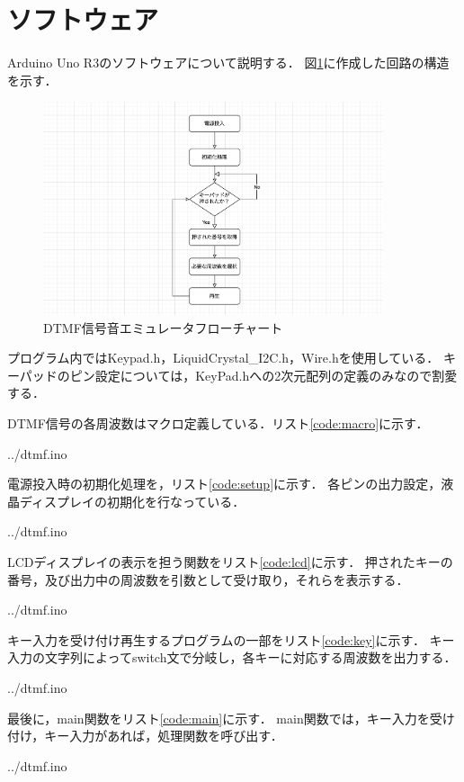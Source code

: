 \documentclass[dvipdfmx,titlepage,a4j]{jsarticle}  %
\begin{document}
\section{ソフトウェア}
Arduino Uno R3のソフトウェアについて説明する．
図\ref{fig:flow.png}に作成した回路の構造を示す．
\begin{figure}[H]
  \centering
  \includegraphics[width=10cm]{../fig/flow.png}
  \caption{DTMF信号音エミュレータフローチャート}
  \label{fig:flow.png}
\end{figure}
プログラム内ではKeypad.h，LiquidCrystal\_I2C.h，Wire.hを使用している．
キーパッドのピン設定については，KeyPad.hへの2次元配列の定義のみなので割愛する．

DTMF信号の各周波数はマクロ定義している．リスト\ref{code:macro}に示す．

{../dtmf.ino}

電源投入時の初期化処理を，リスト\ref{code:setup}に示す．
各ピンの出力設定，液晶ディスプレイの初期化を行なっている．

{../dtmf.ino}

LCDディスプレイの表示を担う関数をリスト\ref{code:lcd}に示す．
押されたキーの番号，及び出力中の周波数を引数として受け取り，それらを表示する．

{../dtmf.ino}

キー入力を受け付け再生するプログラムの一部をリスト\ref{code:key}に示す．
キー入力の文字列によってswitch文で分岐し，各キーに対応する周波数を出力する．

{../dtmf.ino}

最後に，main関数をリスト\ref{code:main}に示す．
main関数では，キー入力を受け付け，キー入力があれば，処理関数を呼び出す．

{../dtmf.ino}
\end{document}
